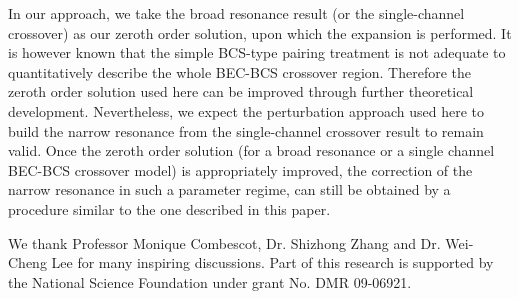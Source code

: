 \documentclass[reprint,pra]{revtex4-1}
\begin{document}


     In our approach, we take the broad resonance result (or the single-channel crossover) as our zeroth order solution, upon which the expansion is performed.  It is however known that the simple BCS-type pairing treatment is not adequate  to quantitatively describe the whole BEC-BCS crossover region.  Therefore the zeroth order solution used here can be improved through further theoretical development.  Nevertheless, we expect the perturbation approach used here to build the narrow resonance from the single-channel crossover result to remain valid.  Once the zeroth order solution (for a broad resonance or a single channel BEC-BCS crossover model) is appropriately improved, the correction of the narrow resonance in such a parameter regime, can still be obtained by  a procedure similar to the one described in this paper.  


\begin{acknowledgements}
We thank  Professor Monique Combescot, Dr. Shizhong Zhang and  Dr. Wei-Cheng Lee for many inspiring discussions. Part of this research  is supported  by the National Science Foundation under grant No. DMR 09-06921. 

\end{acknowledgements}

\appendix
\end{document}
